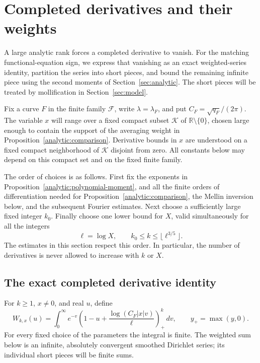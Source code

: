 \section{Completed derivatives and their weights}
\label{sec:weights}

A large analytic rank forces a completed derivative to vanish. For the
matching functional-equation sign, we express that vanishing as an exact
weighted-series identity, partition the series into short pieces, and
bound the remaining infinite piece using the second moments of
Section~\ref{sec:analytic}.
The short pieces will be treated by mollification in
Section~\ref{sec:model}.

Fix a curve \(F\) in the finite family \(\mathcal F\), write
\(\lambda=\lambda_F\), and put \(C_F=\sqrt{q_F}/(2\pi)\).
The variable \(x\) will range over a fixed compact subset
\(\mathcal K\) of \(\mathbb R\setminus\{0\}\), chosen large enough to
contain the support of the averaging weight in
Proposition~\ref{analytic:comparison}. Derivative bounds in \(x\) are
understood on a fixed compact neighborhood of \(\mathcal K\) disjoint
from zero. All constants below may depend on this compact set and on
the fixed finite family.

The order of choices is as follows. First fix the exponents in
Proposition~\ref{analytic:polynomial-moment}, and all the finite orders of
differentiation needed for Proposition~\ref{analytic:comparison}, the
Mellin inversion below, and the subsequent Fourier estimates. Next
choose a sufficiently large fixed integer \(k_0\). Finally choose one
lower bound for \(X\), valid simultaneously for all the integers
\begin{equation}
 \ell=\log X,\qquad
 k_0\le k\le \lfloor\ell^{3/5}\rfloor .
 \label{weights:range}
\end{equation}
The estimates in this section respect this order. In particular, the
number of derivatives is never allowed to increase with \(k\) or \(X\).

\subsection{The exact completed derivative identity}

For \(k\ge1\), \(x\ne0\), and real \(u\), define
\begin{equation}
 W_{k,x}(u)=
 \int_0^\infty e^{-v}
 \left(1-u+\frac{\log(C_F|x|v)}{\ell}\right)_+^k\,dv,
 \qquad y_+=\max(y,0).
 \label{weights:W}
\end{equation}
For every fixed choice of the parameters the integral is finite.
The weighted sum below is an infinite, absolutely convergent smoothed
Dirichlet series; its individual short pieces will be finite sums.


